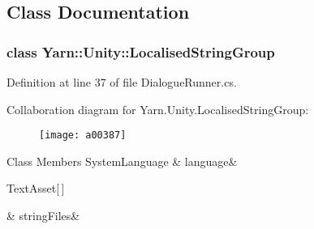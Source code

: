 \subsection{Class Documentation}
\label{a00381}
\hypertarget{a00137_a00381}{}
\subsubsection{class Yarn\-:\-:Unity\-:\-:Localised\-String\-Group}


Definition at line 37 of file Dialogue\-Runner.\-cs.



Collaboration diagram for Yarn.\-Unity.\-Localised\-String\-Group\-:
\nopagebreak
\begin{figure}[H]
\begin{center}
\leavevmode
\texttt{[image: a00387]}
\end{center}
\end{figure}
\begin{DoxyFields}{Class Members}
\hypertarget{a00137_a395d808fa32cb4fe68a62d7852534e1a}{System\-Language}\label{a00137_a395d808fa32cb4fe68a62d7852534e1a}
&
language&
\\
\hline

\hypertarget{a00137_a636624112fd57fedda96d485d20e6b9e}{Text\-Asset\mbox{[}$\,$\mbox{]}}\label{a00137_a636624112fd57fedda96d485d20e6b9e}
&
string\-Files&
\\
\hline

\end{DoxyFields}
